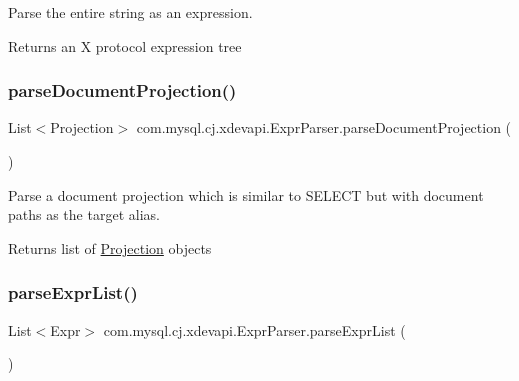 Parse the entire string as an expression.

\begin{DoxyReturn}{Returns}
an X protocol expression tree 
\end{DoxyReturn}
\mbox{\label{classcom_1_1mysql_1_1cj_1_1xdevapi_1_1_expr_parser_a93ace436851f9df69c5e69828b19d02c}} 
\subsubsection{\texorpdfstring{parse\+Document\+Projection()}{parseDocumentProjection()}}
{\footnotesize\ttfamily List$<$Projection$>$ com.\+mysql.\+cj.\+xdevapi.\+Expr\+Parser.\+parse\+Document\+Projection (\begin{DoxyParamCaption}{ }\end{DoxyParamCaption})}

Parse a document projection which is similar to S\+E\+L\+E\+CT but with document paths as the target alias.

\begin{DoxyReturn}{Returns}
list of \mbox{\hyperlink{}{Projection}} objects 
\end{DoxyReturn}
\mbox{\label{classcom_1_1mysql_1_1cj_1_1xdevapi_1_1_expr_parser_ae0e58b00609560b6a43556d12491d152}} 
\subsubsection{\texorpdfstring{parse\+Expr\+List()}{parseExprList()}}
{\footnotesize\ttfamily List$<$Expr$>$ com.\+mysql.\+cj.\+xdevapi.\+Expr\+Parser.\+parse\+Expr\+List (\begin{DoxyParamCaption}{ }\end{DoxyParamCaption})}

